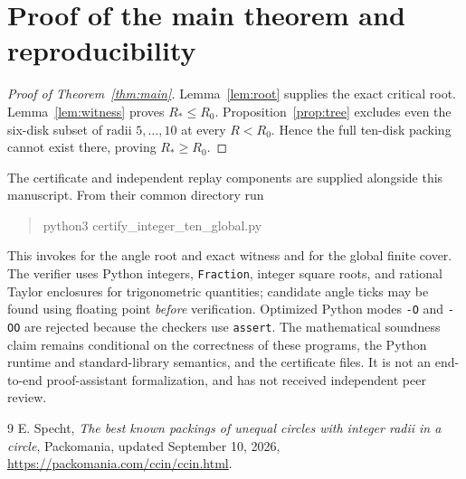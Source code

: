 \documentclass[11pt,a4paper]{article}
\newcommand{\Rstar}{R_*}
\begin{document}
\section{Proof of the main theorem and reproducibility}
\begin{proof}[Proof of Theorem~\ref{thm:main}]
Lemma~\ref{lem:root} supplies the exact critical root.  Lemma~\ref{lem:witness}
proves $\Rstar\le R_0$.  Proposition~\ref{prop:tree} excludes even the
six-disk subset of radii $5,\ldots,10$ at every $R<R_0$.  Hence the full
ten-disk packing cannot exist there, proving $\Rstar\ge R_0$.
\end{proof}

The certificate and independent replay components are supplied alongside
this manuscript.  From their common directory run
\begin{quote}\ttfamily\small
python3 certify\_integer\_ten\_global.py
\end{quote}
This invokes  for the angle root and exact
witness and  for the global finite
cover.  The verifier uses Python integers, \texttt{Fraction}, integer square
roots, and rational Taylor enclosures for trigonometric quantities; candidate
angle ticks may be found using floating point \emph{before} verification.
Optimized Python modes \texttt{-O} and \texttt{-OO} are rejected because the
checkers use \texttt{assert}.  The mathematical soundness claim remains
conditional on the correctness of these programs, the Python runtime and
standard-library semantics, and the certificate files.  It is not an
end-to-end proof-assistant formalization, and has not received independent
peer review.

\begin{thebibliography}{9}
E. Specht, \emph{The best known packings of unequal circles with integer
radii in a circle}, Packomania, updated September 10, 2026,
\url{https://packomania.com/ccin/ccin.html}.
\end{thebibliography}
\end{document}
